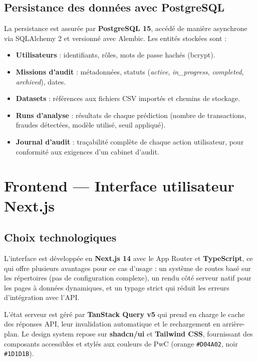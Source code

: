 \documentclass[12pt,a4paper,twoside]{report}
\begin{document}
\subsection{Persistance des données avec PostgreSQL}

La persistance est assurée par \textbf{PostgreSQL 15}, accédé de manière asynchrone via SQLAlchemy 2 et versionné avec Alembic. Les entités stockées sont :

\begin{itemize}
  \item \textbf{Utilisateurs} : identifiants, rôles, mots de passe hachés (bcrypt).
  \item \textbf{Missions d'audit} : métadonnées, statuts (\textit{active}, \textit{in\_progress}, \textit{completed}, \textit{archived}), dates.
  \item \textbf{Datasets} : références aux fichiers CSV importés et chemins de stockage.
  \item \textbf{Runs d'analyse} : résultats de chaque prédiction (nombre de transactions, fraudes détectées, modèle utilisé, seuil appliqué).
  \item \textbf{Journal d'audit} : traçabilité complète de chaque action utilisateur, pour conformité aux exigences d'un cabinet d'audit.
\end{itemize}


\section{Frontend --- Interface utilisateur Next.js}

\subsection{Choix technologiques}

L'interface est développée en \textbf{Next.js 14} avec le App Router et \textbf{TypeScript}, ce qui offre plusieurs avantages pour ce cas d'usage : un système de routes basé sur les répertoires (pas de configuration complexe), un rendu côté serveur natif pour les pages à données dynamiques, et un typage strict qui réduit les erreurs d'intégration avec l'API.

L'état serveur est géré par \textbf{TanStack Query v5} qui prend en charge le cache des réponses API, leur invalidation automatique et le rechargement en arrière-plan. Le design system repose sur \textbf{shadcn/ui} et \textbf{Tailwind CSS}, fournissant des composants accessibles et stylés aux couleurs de PwC (orange \texttt{\#D04A02}, noir \texttt{\#1D1D1B}).
\end{document}
